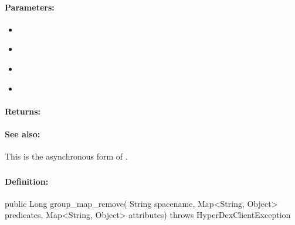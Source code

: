 \paragraph{Parameters:}
\begin{itemize}[noitemsep]
\item {}\\

\item {}\\

\item {}\\

\item {}\\

\end{itemize}

\paragraph{Returns:}


\paragraph{See also:}  This is the asynchronous form of .

\pagebreak
\subsubsection{}
\label{api:java:group_map_remove}


\paragraph{Definition:}
\begin{javacode}
public Long group_map_remove(
        String spacename,
        Map<String, Object> predicates,
        Map<String, Object> attributes) throws HyperDexClientException
\end{javacode}

